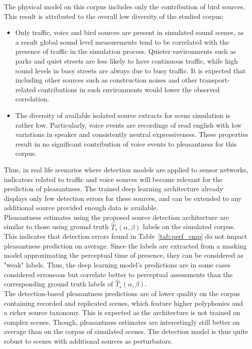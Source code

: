 \documentclass[11pt,a4paper]{article}
\begin{document}
The physical model on this corpus includes only the contribution of bird sources. This result is attributed to the overall low diversity of the studied corpus:
\begin{itemize}
\item Only traffic, voice and bird sources are present in simulated sound scenes, as a result global sound level measurements tend to be correlated with the presence of traffic in the simulation process. Quieter environments such as parks and quiet streets are less likely to have continuous traffic, while high sound levels in busy streets are always due to busy traffic. It is expected that including other sources such as construction noises and other transport-related contributions in such environments would lower the observed correlation.
\item The diversity of available isolated source extracts for scene simulation is rather low. Particularly, voice events are recordings of read english with low variations in speaker and consistently neutral expressiveness. These properties result in no significant contribution of voice events to pleasantness for this corpus.
\end{itemize}
Thus, in real life scenarios where detection models are applied to sensor networks, indicators related to traffic and voice sources will become relevant for the prediction of pleasantness. The trained deep learning architecture already displays only few detection errors for these sources, and can be extended to any additional source provided enough data is available.\\

Pleasantness estimates using the proposed source detection architecture are similar to those using ground truth $\hat T_s(\alpha, \beta)$ labels on the simulated corpus. This indicates that detection errors found in Table~\ref{tab:perf_cmp} do not impact pleasantness prediction on average. Since the labels are extracted from a masking model approximating the perceptual time of presence, they can be considered as "weak" labels. Thus, the deep learning model's predictions are in some cases considered erroneous but correlate better to perceptual assessments than the corresponding ground truth labels of $\hat T_s(\alpha, \beta)$.\\

The detection-based pleasantness predictions are of lower quality on the corpus containing recorded and replicated scenes, which feature higher polyphonies and a richer source taxonomy. This is expected as the architecture is not trained on complex scenes. Though, pleasantness estimates are interestingly still better on average than on the corpus of simulated scenes. The detection model is thus quite robust to scenes with additional sources as perturbators.
\end{document}
